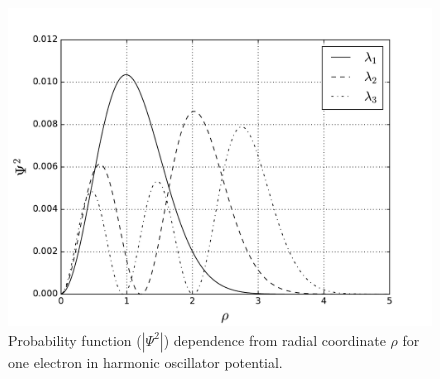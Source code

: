 \documentclass[10pt]{article}
\begin{document}
\begin{figure}
  \begin{center}
    \includegraphics[scale=0.7]{one_electron}
    \caption {Probability function ($|\Psi^{2}|$) dependence from radial coordinate $\rho $ for one electron in harmonic oscillator potential.}
    \label{fig:one_electron}
  \end{center}
\end{figure}
\end{document}
